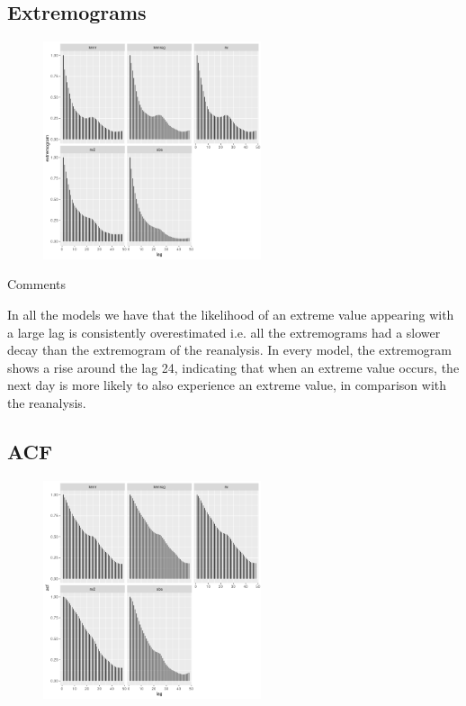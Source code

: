 \documentclass[xcolor=dvipsnames]{beamer}
\begin{document}
    \subsection{Extremograms}
    \begin{frame}{}
        \begin{figure}
            \centering
                 \includegraphics[width=0.57\textwidth]{images/extremograms.png}
       \end{figure}
    \end{frame}
    \begin{frame}{Comments}
        \begin{outline}
            \1 In all the models we have that the likelihood of an extreme value appearing with a large lag is consistently overestimated i.e. all the extremograms had a slower decay than the extremogram of the reanalysis.
            \1 In every model, the extremogram shows a rise around the lag 24, indicating that when an extreme value occurs, the next day is more likely to also experience an extreme value, in comparison with the reanalysis.
        \end{outline}
    \end{frame}    

    \subsection{ACF}
    \begin{frame}{}
        \begin{figure}
            \centering
                \includegraphics[width=0.57\textwidth]{images/acf.png}
       \end{figure}
    \end{frame}
\end{document}
